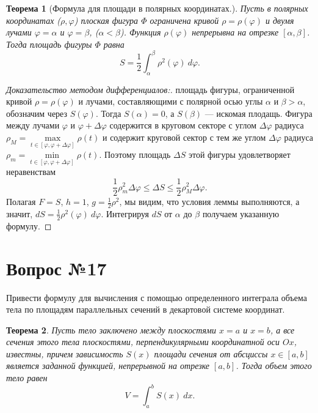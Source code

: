 \documentclass[12pt]{report}
\numberwithin{equation}{section}
\newtheorem{theorem}{Теорема}[section]
\begin{document}
\begin{theorem}[Формула для площади в полярных координатах.] \label{th:16:1}
Пусть в полярных координатах ($\rho, \varphi$) плоская фигура $\Phi$ ограничена кривой $\rho = \rho(\varphi)$ и двумя лучами $\varphi = \alpha$ и $\varphi = \beta$, ($\alpha < \beta$). Функция $\rho(\varphi)$ непрерывна на отрезке $[\alpha, \beta]$. Тогда площадь фигуры $\Phi$ равна
\[ S = \frac{1}{2}\int_{\alpha}^{\beta} \rho^2(\varphi)~d\varphi.\]
\end{theorem}
\begin{proof}[Доказательство методом дифференциалов:] площадь фигуры, ограниченной кривой $\rho = \rho(\varphi)$ и лучами, составляющими с полярной осью углы $\alpha$ и $\beta > \alpha$, обозначим через $S(\varphi)$. Тогда $S(\alpha) = 0$, а $S(\beta)$ --- искомая плодащь. Фигура между лучами $\varphi$ и $\varphi + \Delta \varphi$ содержится в круговом секторе с углом $\Delta \varphi$ радиуса $\rho_M = \max\limits_{t \in [\varphi, \varphi + \Delta \varphi] }\rho(t)$ и содержит круговой сектор с тем же углом $\Delta \varphi$ радиуса $\rho_m = \min\limits_{t \in [\varphi, \varphi + \Delta \varphi]} \rho(t)$. Поэтому площадь $\Delta S$ этой фигуры удовлетворяет неравенствам
\[ \frac{1}{2} \rho^2_m \Delta \varphi \leqslant \Delta S \leqslant \frac{1}{2} \rho^2_M \Delta \varphi.\]
Полагая $F = S$, $h = 1$, $g = \frac{1}{2} \rho^2$, мы видим, что условия леммы выполняются, а значит, $dS = \frac{1}{2} \rho^2(\varphi)~d \varphi$. Интегрируя $dS$ от $\alpha$ до $\beta$ получаем указанную формулу.
\end{proof}

\newpage \section{Вопрос №17} %
\begin{framed}
Привести формулу для вычисления с помощью определенного интеграла объема тела по площадям параллельных сечений в декартовой системе координат.
\end{framed}

\begin{theorem} \label{th:17:1}
Пусть тело заключено между плоскостями $x = a$ и $x = b$, а все сечения этого тела плоскостями, перпендикулярными координатной оси $Ox$, известны, причем зависимость $S(x)$ площади сечения от абсциссы $x \in [a,b]$ является заданной функцией, непрерывной на отрезке $[a,b]$. Тогда объем этого тело равен
\[ V = \int_a^b S(x)~dx.\]
\end{theorem}
\end{document}
